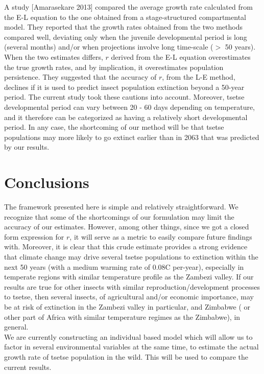 \documentclass[10pt,a4paper]{article}
\begin{document}
A study [Amarasekare 2013] compared the average growth rate calculated from the E-L equation to the one obtained from a stage-structured compartmental model. They reported that the growth rates obtained from the two methods compared well, deviating only when the juvenile developmental period is long (several months) and/or when projections involve long time-scale ($>$ 50 years).  When the two estimates differs, $r$ derived from the E-L equation overestimates the true growth rates, and by implication, it overestimates population persistence. They suggested that the accuracy of $r$, from the L-E method, declines if it is used to predict insect population extinction beyond a 50-year period.  The current study took these cautions into account.  Moreover, tsetse developmental period can vary between 20 - 60 days depending on temperature, and it therefore can be categorized as having a relatively  short developmental period.   In any case, the shortcoming of our method will be that tsetse populations may more likely to go extinct earlier than in 2063 that was predicted by our results. 


\section*{Conclusions}
The framework presented here is simple and relatively straightforward. We recognize that some of the shortcomings of our formulation may limit the accuracy of our estimates.  However, among other things, since we got a closed form expression for $r$, it will serve as a metric to easily compare future findings with. Moreover,  it is clear that this crude estimate provides a strong evidence that climate change may drive several tsetse populations to extinction within the next 50 years (with a medium warming rate of 0.08\degree C per-year), especially in temperate regions with similar temperature profile as  the Zambezi valley. If our results are true for other insects with similar reproduction/development processes to tsetse, then several insects, of agricultural and/or economic importance, may be at risk of extinction in the Zambezi valley in particular, and Zimbabwe ( or other part of Africa with similar temperature regimes as the Zimbabwe),  in general. \\

We are currently constructing an individual based model which will allow us to factor in several environmental variables at the same time, to estimate the actual growth rate of tsetse population in the wild. This will be used to compare the current results. 
\end{document}
